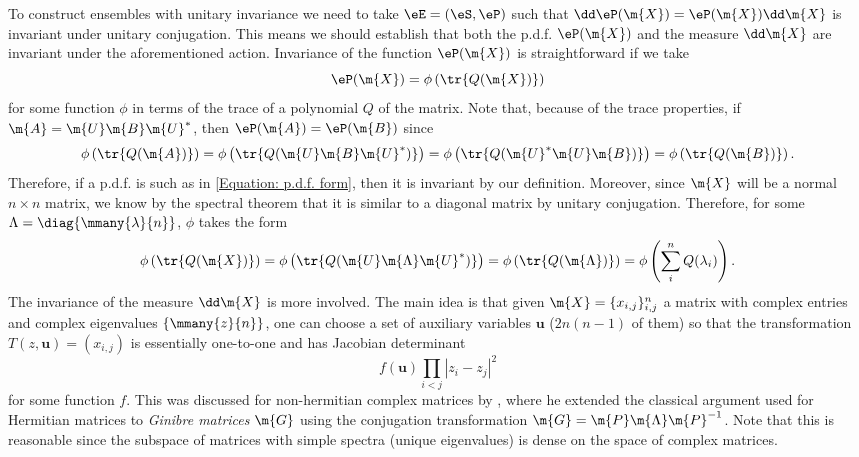 To construct ensembles with unitary invariance we need to take $\eE = (\eS, \eP)$ such that $\dd \eP(\m{X}) = \eP(\m{X}) \dd \m{X}$ is invariant under unitary conjugation. This means we should establish that both the p.d.f. $\eP(\m{X})$ and the measure $\dd \m{X}$ are invariant under the aforementioned action. Invariance of the function $\eP(\m{X})$ is straightforward if we take   
\begin{equation} \label{Equation: p.d.f. form}
	\eP(\m{X}) = \phi\left(\tr{Q(\m{X})}\right)
\end{equation}
for some function $\phi$ in terms of the trace of a polynomial $Q$ of the matrix. Note that, because of the trace properties, if $\m{A} = \m{U} \m{B} \m{U}^*$, then $\eP(\m{A}) = \eP(\m{B})$ since
\begin{equation}
	 \phi\left(\tr{Q(\m{A})}\right) = \phi\left(\tr{Q(\m{U}\m{B}\m{U}^*)}\right) = 	\phi\left(\tr{Q(\m{U}^*\m{U}\m{B})}\right)  = \phi\left(\tr{Q(\m{B})}\right).
\end{equation}
Therefore, if a p.d.f. is such as in \eqref{Equation: p.d.f. form}, then it is invariant by our definition. Moreover, since $\m{X}$ will be a normal $n\times n$ matrix, we know by the spectral theorem that it is similar to a diagonal matrix by unitary conjugation. Therefore, for some $\Lambda = \diag\{\mmany{\lambda}{n}\}$, $\phi$ takes the form
\begin{equation}
	\phi\left(\tr{Q(\m{X})}\right) = \phi\left(\tr{Q(\m{U}\m{\Lambda}\m{U}^*)}\right) = \phi\left(\tr{Q(\m{\Lambda})}\right) = \phi\left(\sum_i^n {Q(\lambda_i)} \right).
\end{equation}
The invariance of the measure $\dd \m{X}$ is more involved. \cite{ZerosJacobian} The main idea is that given $\m{X} = \{x_{i,j}\}_{i,j}^n$ a matrix with complex entries and complex eigenvalues $\{\mmany{z}{n}\}$, one can choose a set of auxiliary variables $\mathbf{u}$ ($2n(n-1)$ of them) so that the transformation $T(z, \mathbf{u}) = (x_{i,j})$ is essentially one-to-one and has Jacobian determinant
\begin{equation}
	f(\mathbf{u}) \prod_{i<j} |z_i - z_j|^2
\end{equation}
for some function $f$. This was discussed for non-hermitian complex matrices by , where he extended the classical argument used for Hermitian matrices to \textit{Ginibre matrices} $\m{G}$ using the conjugation transformation $\m{G} = \m{P}\m{\Lambda}\m{P}^{-1}$. Note that this is reasonable since the subspace of matrices with simple spectra (unique eigenvalues) is dense on the space of complex matrices. 

